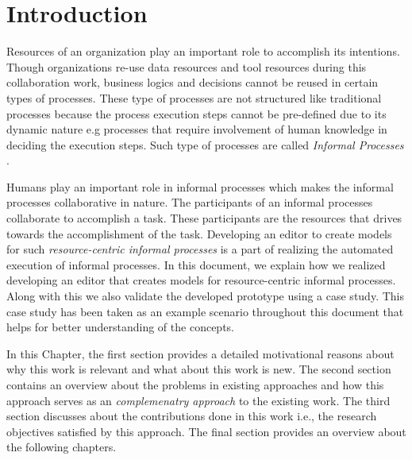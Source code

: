 \chapter{Introduction}
\label{chap:introduction}

Resources of an organization play an important role to accomplish its intentions. Though organizations re-use data resources and tool resources during this collaboration work, business logics and decisions cannot be reused in certain types of processes. These type of processes are not structured like traditional processes because the process execution steps cannot be pre-defined due to its dynamic nature e.g processes that require involvement of human knowledge in deciding the execution steps. Such type of processes are called \textit{Informal Processes} \cite{Sungur2014}.

Humans play an important role in informal processes which makes the informal processes collaborative in nature. The participants of an informal processes collaborate to accomplish a task. These participants are the resources that drives towards the accomplishment of the task.  Developing an editor to create models for such \textit{resource-centric informal processes} is a part of realizing the automated execution of informal processes. In this document, we explain how we realized developing an editor that creates models for resource-centric informal processes. Along with this we also validate the developed prototype using a case study. This case study has been taken as an example scenario throughout this document that helps for better understanding of the concepts.

In this Chapter, the first section provides a detailed motivational reasons about why this work is relevant and what about this work is new.  The second section contains an overview about the problems in existing approaches and how this approach serves as an \textit{complemenatry approach} to the existing work. The third section discusses about the contributions done in this work i.e., the research objectives satisfied by this approach. The final section provides an overview about the following chapters. 

